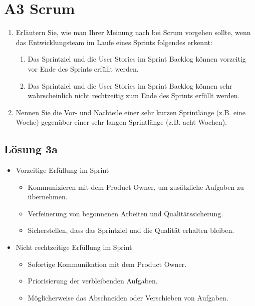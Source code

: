 \documentclass[main.tex]{subfiles}
\begin{document}
\section{A3 Scrum}
\begin{enumerate}
    \item Erläutern Sie, wie man Ihrer Meinung nach bei Scrum vorgehen sollte, wenn das Entwicklungsteam im Laufe eines Sprints folgendes erkennt:
    \begin{enumerate}
        \item Das Sprintziel und die User Stories im Sprint Backlog können vorzeitig vor Ende des Sprints erfüllt werden.
        \item Das Sprintziel und die User Stories im Sprint Backlog können sehr wahrscheinlich nicht rechtzeitig zum Ende des Sprints erfüllt werden.
    \end{enumerate}
    \item Nennen Sie die Vor- und Nachteile einer sehr kurzen Sprintlänge (z.B. eine Woche) gegenüber einer sehr langen Sprintlänge (z.B. acht Wochen).
\end{enumerate}

\subsection{Lösung 3a}

\begin{itemize}
    \item Vorzeitige Erfüllung im Sprint
    \begin{itemize}
        \item Kommunizieren mit dem Product Owner, um zusätzliche Aufgaben zu übernehmen.
        \item Verfeinerung von begonnenen Arbeiten und Qualitätssicherung.
        \item Sicherstellen, dass das Sprintziel und die Qualität erhalten bleiben.
    \end{itemize}
    \item Nicht rechtzeitige Erfüllung im Sprint
    \begin{itemize}
        \item Sofortige Kommunikation mit dem Product Owner.
        \item Priorisierung der verbleibenden Aufgaben.
        \item Möglicherweise das Abschneiden oder Verschieben von Aufgaben.             
    \end{itemize}
\end{itemize}
\end{document}
